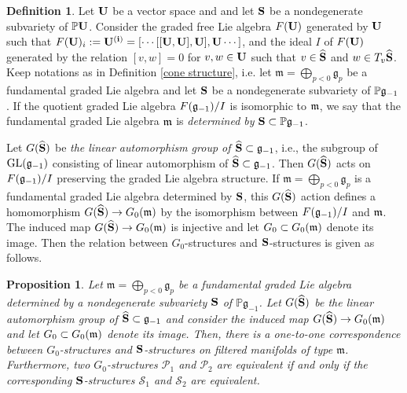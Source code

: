 \documentclass[12pt]{amsart}
\theoremstyle{plain}
\newtheorem{proposition}[theorem]{Proposition}
\theoremstyle{definition}
\newtheorem{definition} [theorem] {Definition}
\def\GL{\operatorname{GL}}
\begin{document}
\begin{definition}   Let ${\bf U}$ be a vector space and and let $ {\bf S} $ be a nondegenerate subvariety of $\mathbb P \bf U$. Consider the graded free Lie algebra $F({\bf U})$ generated by $\bf U$ such that  $F({\bf U})_{i}:=\bf U ^{(i)}=[\cdots[[\bf U,\bf U],\bf U],\bf U \cdots]$, and  the ideal $I$ of $F(\bf U)$ generated by the relation $[v,w]=0$ for $v,w \in {\bf U}$ such that $v \in \widehat{{\bf S}}$ and  $w \in T_v \widehat{{\bf S}}$. Keep notations as in Definition \ref{cone structure}, i.e. let $\mathfrak m=\bigoplus_{p<0}\mathfrak g_{p}$ be a fundamental graded Lie algebra and let ${\bf S}$ be a nondegenerate subvariety of $\mathbb P {\frak g_{-1}}$. If the  quotient graded Lie algebra $ F({\frak  g_{-1}})/I$ is isomorphic to $\frak m$, we say that the fundamental graded Lie algebra $\frak m$ is  \emph{determined by} ${\bf S} \subset \mathbb P \frak g_{-1}$.
\end{definition}

Let $G(\widehat{\bf S})$ be {\it the linear automorphism group of $\widehat{\bf S} \subset \frak g_{-1}$}, i.e., the  subgroup of $\GL(\frak g_{-1})$ consisting of   linear automorphism  of $\widehat{\bf S} \subset \frak g_{-1}$. Then $G(\widehat{\bf S})$ acts on $F({\frak  g_{-1}})/I$ preserving the graded Lie algebra structure. If $\mathfrak m=\bigoplus_{p<0}\mathfrak g_{p}$ is a fundamental graded Lie algebra determined by  $ {\bf S} $, this $G(\widehat{\bf S})$ action defines a homomorphism $G(\widehat{\bf S}) \rightarrow G_0(\frak m)$ by the isomorphism between $F({\frak  g_{-1}})/I$ and $\frak m$. The induced map $G(\widehat{\bf S}) \rightarrow G_0(\frak m)$ is injective and let $G_0 \subset G_0(\frak m)$ denote its image. Then the relation between $G_0$-structures and ${\bf S}$-structures is given as follows.


\begin{proposition} \label{S-str and G_0-str} Let $\mathfrak m=\bigoplus_{p<0}\mathfrak g_{p}$ be a fundamental graded Lie algebra determined by a nondegenerate subvariety  $ {\bf S} $    of $\mathbb P {\mathfrak g_{-1}}$. Let $G(\widehat{\bf S})$ be \it the linear automorphism group of $\widehat{\bf S} \subset \frak g_{-1}$ and consider the induced map $G(\widehat{\bf S}) \rightarrow G_0(\frak m)$ and let $G_0 \subset G_0(\frak m)$ denote its image.
 Then, there is a one-to-one correspondence between $G_0$-structures  and ${\bf S}$-structures on filtered manifolds of type $\mathfrak m$. Furthermore, two $G_0$-structures $\mathscr P_1$ and $\mathscr P_2$ are equivalent if and only if the corresponding ${\bf S}$-structures $\mathcal S_1$ and $\mathcal S_2$ are equivalent.
\end{proposition}
\end{document}
